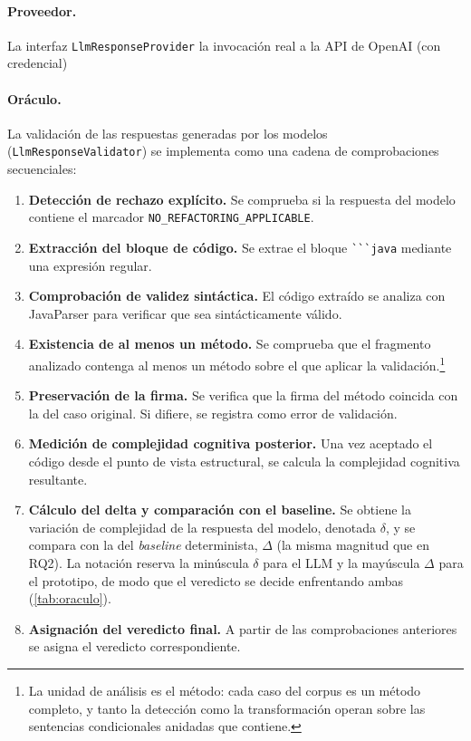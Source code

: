 \paragraph{Proveedor.} La interfaz \texttt{LlmResponseProvider} la invocación real a la API de OpenAI
(con credencial)

\paragraph{Oráculo.}

La validación de las respuestas generadas por los modelos
(\texttt{LlmResponseValidator}) se implementa como una cadena de
comprobaciones secuenciales:

\begin{enumerate}
    \item \textbf{Detección de rechazo explícito.}  
    Se comprueba si la respuesta del modelo contiene el marcador \lstinline|NO_REFACTORING_APPLICABLE|.

    \item \textbf{Extracción del bloque de código.}  
    Se extrae el bloque \lstinline|```java| mediante una expresión regular.

    \item \textbf{Comprobación de validez sintáctica.}  
    El código extraído se analiza con JavaParser para verificar que sea sintácticamente válido.

    \item \textbf{Existencia de al menos un método.}  
    Se comprueba que el fragmento analizado contenga al menos un método sobre el que aplicar la validación.\footnote{La unidad de análisis es el método: cada caso del corpus es un método completo, y tanto la detección como la transformación operan sobre las sentencias condicionales anidadas que contiene.}

    \item \textbf{Preservación de la firma.}  
    Se verifica que la firma del método coincida con la del caso original. Si difiere, se registra como error de validación.

    \item \textbf{Medición de complejidad cognitiva posterior.}  
    Una vez aceptado el código desde el punto de vista estructural, se calcula la complejidad cognitiva resultante.

    \item \textbf{Cálculo del delta y comparación con el baseline.}
    Se obtiene la variación de complejidad de la respuesta del modelo,
    denotada $\delta$, y se compara con la del \emph{baseline} determinista,
    $\Delta$ (la misma magnitud que en RQ2). La notación reserva la minúscula
    $\delta$ para el LLM y la mayúscula $\Delta$ para el prototipo, de modo que
    el veredicto se decide enfrentando ambas (\autoref{tab:oraculo}).

    \item \textbf{Asignación del veredicto final.}  
    A partir de las comprobaciones anteriores se asigna el veredicto correspondiente.
\end{enumerate}

